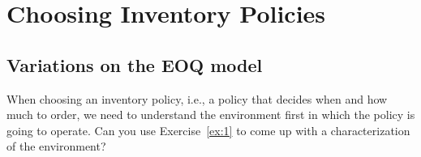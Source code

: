 
\section{Choosing Inventory Policies}

\subsection{Variations on the EOQ model}
\label{sec:variations-eoq-model}

\begin{exercise}
  When choosing an inventory policy, i.e., a policy that decides when
  and how much to order, we need to understand the environment first
  in which the policy is going to operate. Can you use
  Exercise~\ref{ex:1} to come up with a characterization of the environment? 

\end{exercise}

